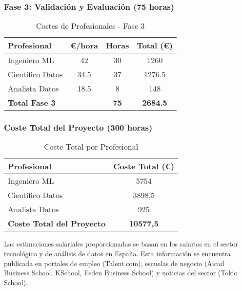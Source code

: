 \subsubsection*{Fase 3: Validación y Evaluación (75 horas)}
\begin{table}[H]
\centering
\begin{tabular}{lccc}
\toprule
Profesional & €/hora & Horas & Total (€) \\
\midrule
Ingeniero ML & 42 & 30 & 1260 \\
Científico Datos & 34.5 & 37 & 1276.5 \\
Analista Datos & 18.5 & 8 & 148 \\
\midrule
\textbf{Total Fase 3} & & \textbf{75} & \textbf{2684.5} \\
\bottomrule
\end{tabular}
\caption{Costes de Profesionales - Fase 3}
\label{tab:costes_fase3}
\end{table}

\subsubsection*{Coste Total del Proyecto (300 horas)}
\begin{table}[H]
\centering
\begin{tabular}{lc}
\toprule
Profesional & Coste Total (€) \\
\midrule
Ingeniero ML & 5754 \\
Científico Datos & 3898,5 \\
Analista Datos & 925 \\
\midrule
\textbf{Coste Total del Proyecto} & \textbf{10577,5} \\
\bottomrule
\end{tabular}
\caption{Coste Total por Profesional}
\label{tab:coste_total_profesional}
\end{table}


Las estimaciones salariales proporcionadas se basan en los salarios en el sector tecnológico y de análisis de datos en España. Esta información se encuentra publicada en portales de empleo (Talent.com), escuelas de negocio (Aicad Business School, KSchool, Esden Business School) y noticias del sector (Tokio School). 










